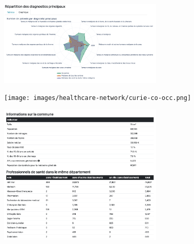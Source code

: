 \begin{figure}[h]
    \includegraphics[width=0.7\textwidth]{images/healthcare-network/curie-dp.png}
    \centering
    \caption{}
    \label{fig:hn-curie-dp}
\end{figure}


\begin{figure}[h]
    \texttt{[image: images/healthcare-network/curie-co-occ.png]}
    \centering
    \caption{}
    \label{fig:hn-curie-co-occ}
\end{figure}


\begin{figure}[h]
    \includegraphics[width=0.7\textwidth]{images/healthcare-network/curie-commune.png}
    \centering
    \caption{}
    \label{fig:hn-curie-commune}
\end{figure}
